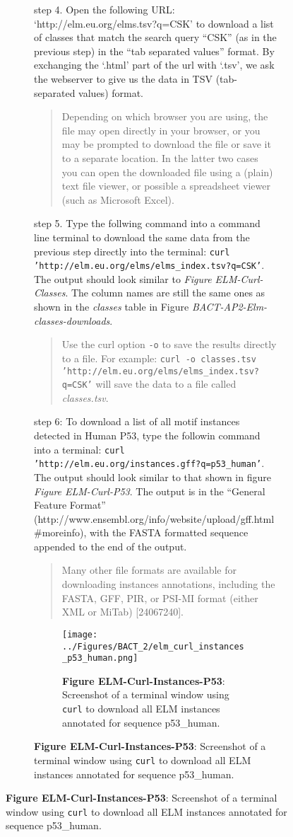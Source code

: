 {\begin{figure}[h!]
{{\begin{figure}[h!]
{{step 4. Open the following URL: `http://elm.eu.org/elms.tsv?q=CSK' to
download a list of classes that match the search query ``CSK'' (as in
the previous step) in the ``tab separated values'' format. By exchanging
the `.html' part of the url with `.tsv', we ask the webserver to give us
the data in TSV (tab-separated values) format.

\begin{quote}
Depending on which browser you are using, the file may open directly in
your browser, or you may be prompted to download the file or save it to
a separate location. In the latter two cases you can open the downloaded
file using a (plain) text file viewer, or possible a spreadsheet viewer
(such as Microsoft Excel).
\end{quote}

step 5. Type the follwing command into a command line terminal to
download the same data from the previous step directly into the
terminal: \texttt{curl 'http://elm.eu.org/elms/elms\_index.tsv?q=CSK'}.
The output should look similar to \emph{Figure ELM-Curl-Classes}. The
column names are still the same ones as shown in the \emph{classes}
table in Figure \emph{BACT-AP2-Elm-classes-downloads}.

\begin{quote}
Use the curl option \texttt{-o} to save the results directly to a file.
For example:
\texttt{curl -o classes.tsv 'http://elm.eu.org/elms/elms\_index.tsv?q=CSK'}
will save the data to a file called \emph{classes.tsv}.
\end{quote}

step 6: To download a list of all motif instances detected in Human P53,
type the followin command into a terminal:
\texttt{curl 'http://elm.eu.org/instances.gff?q=p53\_human'}. The output
should look similar to that shown in figure \emph{Figure ELM-Curl-P53}.
The output is in the ``General Feature Format''
(http://www.ensembl.org/info/website/upload/gff.html\#moreinfo), with
the FASTA formatted sequence appended to the end of the output.

\begin{quote}
Many other file formats are available for downloading instances
annotations, including the FASTA, GFF, PIR, or PSI-MI format (either XML
or MiTab) {[}24067240{]}.
\end{quote}

\begin{figure}[h!]
\centering
\texttt{[image: ../Figures/BACT\_2/elm\_curl\_instances\_p53\_human.png]}
\caption{
\textbf{Figure ELM-Curl-Instances-P53}: Screenshot of a terminal window
using \texttt{curl} to download all ELM instances annotated for sequence
p53\_human.
}
\end{figure}

}}
\end{figure}}}
\end{figure}}

